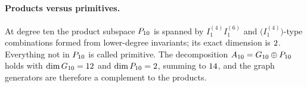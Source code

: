 \paragraph{Products versus primitives.}
At degree ten the product subspace $P_{10}$ is spanned by
$I^{(4)}_1 I^{(6)}_1$ and $\bigl(I^{(4)}_1\bigr)$-type combinations formed from
lower-degree invariants; its exact dimension is $2$. Everything not in
$P_{10}$ is called primitive. The decomposition
$A_{10} = G_{10} \oplus P_{10}$ holds with $\dim G_{10} = 12$ and
$\dim P_{10} = 2$, summing to $14$, and the graph generators are
therefore a complement to the products.
